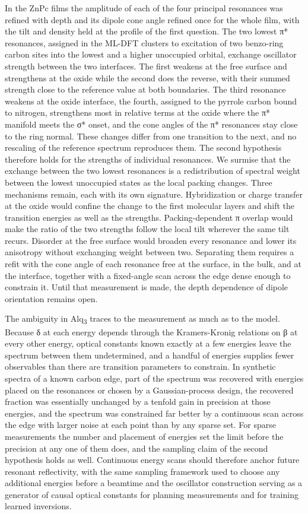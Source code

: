 In the ZnPc films the amplitude of each of the four principal resonances was refined with depth and its dipole cone angle refined once for the whole film, with the tilt and density held at the profile of the first question. The two lowest π* resonances, assigned in the ML-DFT clusters to excitation of two benzo-ring carbon sites into the lowest and a higher unoccupied orbital, exchange oscillator strength between the two interfaces. The first weakens at the free surface and strengthens at the oxide while the second does the reverse, with their summed strength close to the reference value at both boundaries. The third resonance weakens at the oxide interface, the fourth, assigned to the pyrrole carbon bound to nitrogen, strengthens most in relative terms at the oxide where the π* manifold meets the σ* onset, and the cone angles of the π* resonances stay close to the ring normal. These changes differ from one transition to the next, and no rescaling of the reference spectrum reproduces them. The second hypothesis therefore holds for the strengths of individual resonances. We surmise that the exchange between the two lowest resonances is a redistribution of spectral weight between the lowest unoccupied states as the local packing changes. Three mechanisms remain, each with its own signature. Hybridization or charge transfer at the oxide would confine the change to the first molecular layers and shift the transition energies as well as the strengths. Packing-dependent π overlap would make the ratio of the two strengths follow the local tilt wherever the same tilt recurs. Disorder at the free surface would broaden every resonance and lower its anisotropy without exchanging weight between two. Separating them requires a refit with the cone angle of each resonance free at the surface, in the bulk, and at the interface, together with a fixed-angle scan across the edge dense enough to constrain it. Until that measurement is made, the depth dependence of dipole orientation remains open.

The ambiguity in Alq\textsubscript{3} traces to the measurement as much as to the model. Because δ at each energy depends through the Kramers-Kronig relations on β at every other energy, optical constants known exactly at a few energies leave the spectrum between them undetermined, and a handful of energies supplies fewer observables than there are transition parameters to constrain. In synthetic spectra of a known carbon edge, part of the spectrum was recovered with energies placed on the resonances or chosen by a Gaussian-process design, the recovered fraction was essentially unchanged by a tenfold gain in precision at those energies, and the spectrum was constrained far better by a continuous scan across the edge with larger noise at each point than by any sparse set. For sparse measurements the number and placement of energies set the limit before the precision at any one of them does, and the sampling claim of the second hypothesis holds as well. Continuous energy scans should therefore anchor future resonant reflectivity, with the same sampling framework used to choose any additional energies before a beamtime and the oscillator construction serving as a generator of causal optical constants for planning measurements and for training learned inversions.

